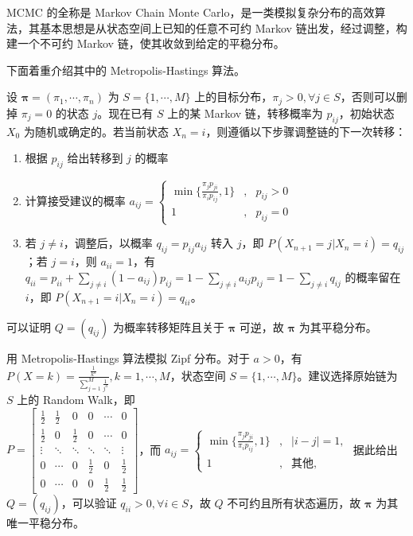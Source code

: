 \documentclass[../main.tex]{subfiles}
\begin{document}
MCMC 的全称是 Markov Chain Monte Carlo，是一类模拟复杂分布的高效算法，其基本思想是从状态空间上已知的任意不可约 Markov 链出发，经过调整，构建一个不可约 Markov 链，使其收敛到给定的平稳分布。

下面着重介绍其中的 Metropolis-Hastings 算法。

设 $\boldsymbol\pi=(\pi_1,\cdots,\pi_n)$ 为 $S=\{1,\cdots,M\}$ 上的目标分布，$\pi_j>0,\forall j\in S$，否则可以删掉 $\pi_j=0$ 的状态 $j$。现在已有 $S$ 上的某 Markov 链，转移概率为 $p_{ij}$，初始状态 $X_0$ 为随机或确定的。若当前状态 $X_n=i$，则遵循以下步骤调整链的下一次转移：
\begin{enumerate}
    \item 根据 $p_{ij}$ 给出转移到 $j$ 的概率
    \item 计算接受建议的概率 $a_{ij}=
              \left\{\begin{aligned}
                  \min\{\frac{\pi_jp_{ji}}{\pi_ip_{ij}},1\} & , & p_{ij}>0 \\
                  1                                         & , & p_{ij}=0
              \end{aligned}\right.$
    \item 若 $j\neq i$，调整后，以概率 $q_{ij}=p_{ij}a_{ij}$ 转入 $j$，即 $P(X_{n+1}=j|X_n=i)=q_{ij}$；若 $j=i$，则 $a_{ii}=1$，有 $q_{ii}=p_{ii}+\sum_{j\neq i}(1-a_{ij})p_{ij}=1-\sum_{j\neq i}a_{ij}p_{ij}=1-\sum_{j\neq i}q_{ij}$ 的概率留在 $i$，即 $P(X_{n+1}=i|X_n=i)=q_{ii}$。
\end{enumerate}
可以证明 $Q=(q_{ij})$ 为概率转移矩阵且关于 $\boldsymbol\pi$ 可逆，故 $\boldsymbol\pi$ 为其平稳分布。

\begin{example}
    用 Metropolis-Hastings 算法模拟 Zipf 分布。对于 $a>0$，有 $P(X=k)=\frac{\frac1{k^a}}{\sum_{j=1}^M\frac1{j^a}},k=1,\cdots,M$，状态空间 $S=\{1,\cdots,M\}$。建议选择原始链为 $S$ 上的 Random Walk，即\\
    $P=\left[\begin{matrix}
                \frac12 & \frac12 & 0       & 0       & \cdots  & 0       \\
                \frac12 & 0       & \frac12 & 0       & \cdots  & 0       \\
                \vdots  & \ddots  & \ddots  & \ddots  & \ddots  & \vdots  \\
                0       & \cdots  & 0       & \frac12 & 0       & \frac12 \\
                0       & \cdots  & 0       & 0       & \frac12 & \frac12
            \end{matrix}\right]$，而 $a_{ij}=
        \left\{\begin{aligned}
            \min\{\frac{\pi_jp_{ji}}{\pi_ip_{ij}},1\} & , & |i-j|=1,     \\
            1                                         & , & \text{其他},
        \end{aligned}\right.$ 据此给出 $Q=(q_{ij})$，可以验证 $q_{ii}>0,\forall i\in S$，故 $Q$ 不可约且所有状态遍历，故 $\boldsymbol\pi$ 为其唯一平稳分布。\\
\end{example}
\end{document}
